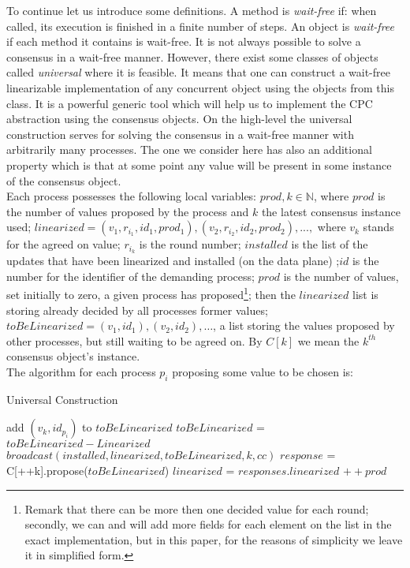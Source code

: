 \documentclass{article}
\theoremstyle{remark}
\begin{document}
To continue let us introduce some definitions. A method is \emph{wait-free} if: when called, its execution is finished in a finite number of steps. An object is \emph{wait-free} if each method it contains is wait-free. 
It is not always possible to solve a consensus in a wait-free manner. However, there exist some classes of objects called \emph{universal} where it is feasible. It means that one can construct a wait-free linearizable implementation of any concurrent object using the objects from this class. It is a powerful generic tool which will help us to implement the CPC abstraction using the consensus objects.  
On the high-level the universal construction serves for solving the consensus in a wait-free manner with arbitrarily many processes. The one we consider here has also an additional property which is that at some point any value will be present in some instance of the consensus object.\\
Each process possesses the following local variables: $prod,k\in\mathbb{N}$, where $prod$ is the number of values proposed by the process and $k$ the latest consensus instance used; $linearized=(v_1,r_{i_1},id_1,prod_1),(v_2,r_{i_2},id_2,prod_2),...,$ where $v_k$ stands for the agreed on value; $r_{i_k}$ is the round number; $installed$ is the list of the updates that have been linearized and installed (on the data plane) ;$id$ is the number for the identifier of the demanding process; $prod$ is the number of values, set initially to zero, a given process has proposed\footnote{Remark that there can be more then one decided value for each round; secondly, we can and will add more fields for each element on the list in the exact implementation, but in this paper, for the reasons of simplicity we leave it in simplified form.}; then the $linearized$ list is storing already decided by all processes former values; $toBeLinearized = (v_1,id_1),(v_2,id_2),\ldots$, a list storing the values proposed by other processes, but still waiting to be agreed on. By $C[k]$ we mean the $k^{th}$ consensus object's instance. \\
The algorithm for each process $p_i$ proposing some value to be chosen is:
\begin{algorithm}
  \caption{Universal Construction}\label{Universal}
  \begin{algorithmic}[1]
   \State add $(v_k,id_{p_i})$ to $toBeLinearized$
   \State $toBeLinearized$ = $toBeLinearized - Linearized$
   \State $broadcast(installed,linearized, toBeLinearized,k,cc)$
   	\Repeat
   		\State $response$ = C[++k].propose($toBeLinearized$)
   		\State $linearized$ = $responses.linearized$
   	\State $++prod$
  \end{algorithmic}
\end{algorithm}
\end{document}
